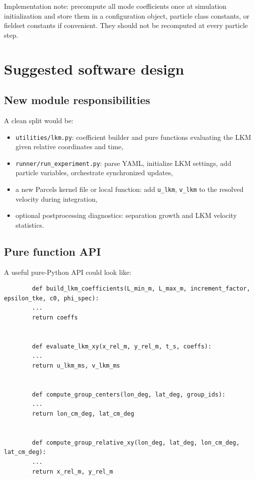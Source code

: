 \documentclass[11pt,a4paper]{article}
\begin{document}
	Implementation note: precompute all mode coefficients once at simulation initialization and store them in a configuration object, particle class constants, or fieldset constants if convenient. They should not be recomputed at every particle step.
	
	\section{Suggested software design}
	
	\subsection{New module responsibilities}
	
	A clean split would be:
	\begin{itemize}[leftmargin=1.5em]
		\item \texttt{utilities/lkm.py}: coefficient builder and pure functions evaluating the LKM given relative coordinates and time,
		\item \texttt{runner/run\_experiment.py}: parse YAML, initialize LKM settings, add particle variables, orchestrate synchronized updates,
		\item a new Parcels kernel file or local function: add \texttt{u\_lkm}, \texttt{v\_lkm} to the resolved velocity during integration,
		\item optional postprocessing diagnostics: separation growth and LKM velocity statistics.
	\end{itemize}
	
	\subsection{Pure function API}
	
	A useful pure-Python API could look like:
	\begin{verbatim}
		def build_lkm_coefficients(L_min_m, L_max_m, increment_factor, epsilon_tke, c0, phi_spec):
		...
		return coeffs
		
		
		def evaluate_lkm_xy(x_rel_m, y_rel_m, t_s, coeffs):
		...
		return u_lkm_ms, v_lkm_ms
		
		
		def compute_group_centers(lon_deg, lat_deg, group_ids):
		...
		return lon_cm_deg, lat_cm_deg
		
		
		def compute_group_relative_xy(lon_deg, lat_deg, lon_cm_deg, lat_cm_deg):
		...
		return x_rel_m, y_rel_m
	\end{verbatim}
	
\end{document}
